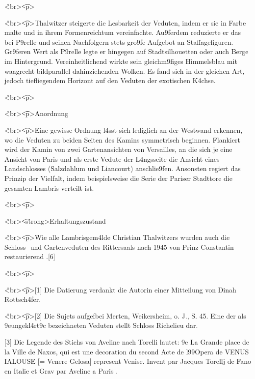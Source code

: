 \documentclass[
  a4paper,
]{book}
\begin{document}
\r<br\textgreater{}\t<p\textgreater{}

\r<br\textgreater{}\t<p\textgreater Thalwitzer steigerte die Lesbarkeit
der Veduten, indem er sie in Farbe malte und in ihrem Formenreichtum
vereinfachte. Au\x9ferdem reduzierte er das bei P\xa9relle und
seinen Nachfolgern stets gro\x9fe Aufgebot an Staffagefiguren.
Gr\x9feren Wert als P\xa9relle legte er hingegen auf
Stadtsilhouetten oder auch Berge im Hintergrund. Vereinheitlichend
wirkte sein gleichm\x9figes Himmelsblau mit waagrecht
bildparallel dahinziehenden Wolken. Es fand sich in der gleichen Art,
jedoch \xbcber tiefliegendem Horizont auf den Veduten der exotischen
K\xbcbelgew{}\xa4chse.

\r<br\textgreater{}\t<p\textgreater{}

\r<br\textgreater{}\t<p\textgreater{}Anordnung

\r<br\textgreater{}\t<p\textgreater Eine gewisse Ordnung l\xa4sst
sich lediglich an der Westwand erkennen, wo die Veduten zu beiden Seiten
des Kamins symmetrisch beginnen. Flankiert wird der Kamin von zwei
Gartenansichten von Versailles, an die sich je eine Ansicht von Paris
und als erste Vedute der L\xa4ngsseite die Ansicht eines
Landschlosses (Salzdahlum und Liancourt) anschlie\x9fen. Ansonsten
regiert das Prinzip der Vielfalt, indem beispielsweise die Serie der
Pariser Stadttore \xbcber die gesamten Lambris verteilt ist.

\r<br\textgreater{}\t<p\textgreater{}

\r<br\textgreater{}\t<h6><strong\textgreater Erhaltungszustand

\r<br\textgreater{}\t<p\textgreater Wie alle Lambrisgem\xa4lde
Christian Thalwitzers wurden auch die Schloss- und Gartenveduten des
Rittersaals nach 1945 von Prinz Constantin restaurierend
\xbcbermalt.{[}6{]}

\r<br\textgreater{}\t<p\textgreater{}

\r<br\textgreater{}\t<p\textgreater{[}1{]} Die Datierung verdankt die
Autorin einer Mitteilung von Dinah Rottsch\xa4fer.

\r<br\textgreater{}\t<p\textgreater{[}2{]} Die Sujets
aufgef\xbchrt bei Merten, Weikersheim, o. J., S. 45.
Eine der als \x9eungekl\xa4rt\x9c bezeichneten
Veduten stellt Schloss Richelieu dar.

{[}3{]} Die Legende des Stichs von Aveline nach Torelli lautet:
\x9e La Grande place de la Ville de Naxos, qui est une
decoration du second Acte de l\x99Opera de VENUS IALOUSE {[}=
Venere Gelosa{]} represent  Venise. Invent par
Jacques Torellj de Fano en Italie et Grav par Aveline a Paris
\xbb.
\end{document}
